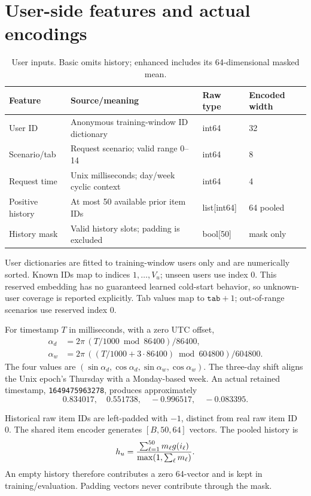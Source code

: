 \documentclass[11pt,a4paper]{article}
\begin{document}
\section{User-side features and actual encodings}
\begin{table}[H]\centering\small
\begin{tabularx}{\linewidth}{lXll}\toprule
Feature & Source/meaning & Raw type & Encoded width\\\midrule
User ID & Anonymous training-window ID dictionary & int64 & 32\\
Scenario/tab & Request scenario; valid range 0--14 & int64 & 8\\
Request time & Unix milliseconds; day/week cyclic context & int64 & 4\\
Positive history & At most 50 available prior item IDs & list[int64] & 64 pooled\\
History mask & Valid history slots; padding is excluded & bool[50] & mask only\\\bottomrule
\end{tabularx}\caption{User inputs. Basic omits history; enhanced includes its 64-dimensional masked mean.}\end{table}

User dictionaries are fitted to training-window users only and are numerically sorted. Known IDs map to indices $1,\ldots,V_u$; unseen users use index 0. This reserved embedding has no guaranteed learned cold-start behavior, so unknown-user coverage is reported explicitly. Tab values map to $\texttt{tab}+1$; out-of-range scenarios use reserved index 0.

For timestamp $T$ in milliseconds, with a zero UTC offset,
\begin{align*}
\alpha_d &=2\pi\,(T/1000\bmod86400)/86400,\\
\alpha_w &=2\pi\,((T/1000+3\cdot86400)\bmod604800)/604800.
\end{align*}
The four values are $(\sin\alpha_d,\cos\alpha_d,\sin\alpha_w,\cos\alpha_w)$. The three-day shift aligns the Unix epoch's Thursday with a Monday-based week. An actual retained timestamp, \texttt{1649475963278}, produces approximately
\[0.834017,\quad 0.551738,\quad -0.996517,\quad -0.083395.\]

Historical raw item IDs are left-padded with $-1$, distinct from real raw item ID 0. The shared item encoder generates $[B,50,64]$ vectors. The pooled history is
\[h_u={\sum_{\ell=1}^{50}m_\ell g(i_\ell)\over\max(1,\sum_\ell m_\ell)}.\]
An empty history therefore contributes a zero 64-vector and is kept in training/evaluation. Padding vectors never contribute through the mask.
\clearpage
\end{document}
